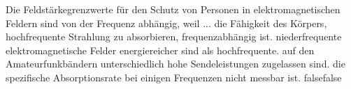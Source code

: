     {Die Feldstärkegrenzwerte für den Schutz von Personen in elektromagnetischen Feldern sind von der Frequenz abhängig, weil ...}
    {die Fähigkeit des Körpers, hochfrequente Strahlung zu absorbieren, frequenzabhängig ist.}
    {niederfrequente elektromagnetische Felder energiereicher sind als hochfrequente.}
    {auf den Amateurfunkbändern unterschiedlich hohe Sendeleistungen zugelassen sind.}
    {die spezifische Absorptionsrate bei einigen Frequenzen nicht messbar ist.}
    {false}{false}